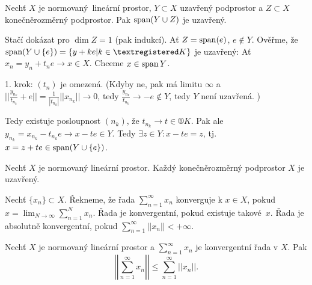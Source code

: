 \documentclass[12pt]{article}					%
\begin{document}
\begin{veta}
	Nechť $X$ je normovaný lineární prostor, $Y \subset X$ uzavřený podprostor a $Z \subset X$ konečněrozměrný podprostor. Pak $\operatorname{span}(Y \cup Z)$ je uzavřený.

	\begin{dukazin}
		Stačí dokázat pro $\dim Z = 1$ (pak indukcí). Ať $Z = \operatorname{span}(e)$, $e \notin Y$. Ověřme, že $\spn(Y \cup \{e\}) = \{y + ke | k \in ®K\}$ je uzavřený: Ať $x_n = y_n + t_n e \rightarrow x \in X$. Chceme $x \in \operatorname{span} Y$.

		1. krok: $(t_n)$ je omezená. (Kdyby ne, pak má limitu $∞$ a $||\frac{y_{n_k}}{t_{n_k}} + e || = \frac{1}{|t_{n_k}|} ||x_{n_k}|| \rightarrow 0$, tedy $\frac{y_{n_k}}{t_{n_k}} \rightarrow -e \notin Y$, tedy $Y$ není uzavřená. \lightning)

		Tedy existuje posloupnost $(n_k)$, že $t_{n_k} \rightarrow t \in ®K$. Pak ale $y_{n_k} = x_{n_k} - t_{n_k}e \rightarrow x - t e \in Y$. Tedy $\exists z \in Y: x - t e = z$, tj. $x = z + t e \in \operatorname{span}(Y \cup \{e\})$.
	\end{dukazin}
\end{veta}

\begin{dusledek}
	Nechť $X$ je normovaný lineární prostor. Každý konečněrozměrný podprostor $X$ je uzavřený.
\end{dusledek}


\begin{definice}
	Nechť $\{x_n\} \subset X$. Řekneme, že řada $\sum_{n=1}^∞ x_n$ konverguje k $x \in X$, pokud $x = {\displaystyle \lim_{N \rightarrow ∞}} \sum_{n=1}^N x_n$. Řada je konvergentní, pokud existuje takové $x$. Řada je absolutně konvergentní, pokud $\sum_{n=1}^∞ ||x_n|| < +∞$.
\end{definice}

\begin{poznamka}[Fakt]
	Nechť $X$ je normovaný lineární prostor a $\sum_{n = 1}^∞ x_n$ je konvergentní řada v $X$. Pak
	$$ \left|\left| \sum_{n=1}^∞ x_n \right|\right| ≤ \sum_{n=1}^∞ ||x_n||. $$
\end{poznamka}
\end{document}
